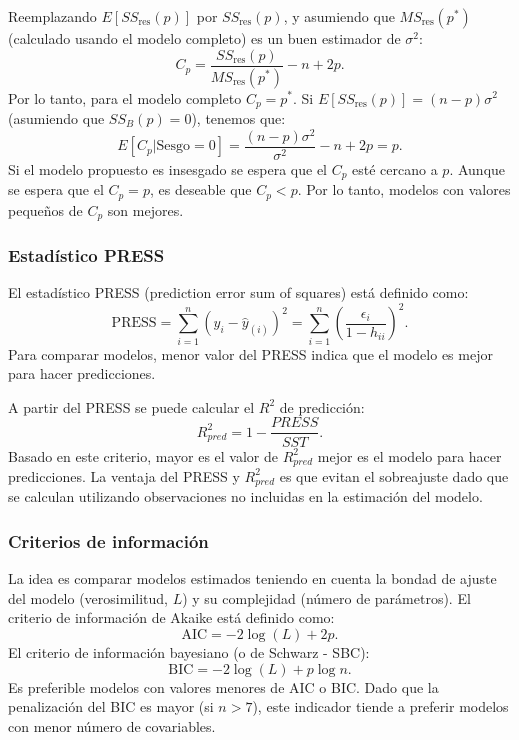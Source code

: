 \documentclass[
]{article}
\begin{document}
Reemplazando \(E[SS_{\mbox{res}}(p)]\) por \(SS_{\mbox{res}}(p)\), y asumiendo que \(MS_{\mbox{res}}(p^{*})\) (calculado usando el modelo completo) es un buen estimador de \(\sigma^{2}\):
\[
C_{p} = \frac{SS_{\mbox{res}}(p)}{MS_{\mbox{res}}(p^{*})} - n + 2p.
\]
Por lo tanto, para el modelo completo \(C_{p} = p^{*}\). Si \(E[SS_{\mbox{res}}(p)] = (n-p)\sigma^{2}\) (asumiendo que \(SS_{B}(p)=0\)), tenemos que:
\[
E[C_{p}| \mbox{Sesgo}=0] = \frac{(n-p)\sigma^{2}}{\sigma^{2}} - n +2p = p.
\]
Si el modelo propuesto es insesgado se espera que el \(C_p\) esté cercano a \(p\). Aunque se espera que el \(C_p=p\), es deseable que \(C_p < p\). Por lo tanto, modelos con valores pequeños de \(C_p\) son mejores.

\hypertarget{estaduxedstico-press}{%
\subsubsection{Estadístico PRESS}\label{estaduxedstico-press}}

El estadístico PRESS (prediction error sum of squares) está definido como:
\[
\mbox{PRESS} = \sum_{i=1}^{n} (y_{i} - \widehat{y}_{(i)})^{2} = \sum_{i=1}^{n} \left( \frac{\epsilon_{i}}{1-h_{ii}} \right)^{2}.
\]
Para comparar modelos, menor valor del PRESS indica que el modelo es mejor para hacer predicciones.

A partir del PRESS se puede calcular el \(R^{2}\) de predicción:
\[
R^{2}_{pred} = 1 - \frac{PRESS}{SST}.
\]
Basado en este criterio, mayor es el valor de \(R^{2}_{pred}\) mejor es el modelo para hacer predicciones. La ventaja del PRESS y \(R_{pred}^{2}\) es que evitan el sobreajuste dado que se calculan utilizando observaciones no incluidas en la estimación del modelo.

\hypertarget{criterios-de-informaciuxf3n}{%
\subsubsection{Criterios de información}\label{criterios-de-informaciuxf3n}}

La idea es comparar modelos estimados teniendo en cuenta la bondad de ajuste del modelo (verosimilitud, \(L\)) y su complejidad (número de parámetros). El criterio de información de Akaike está definido como:
\[
\mbox{AIC} = -2\log (L) + 2p.
\]
El criterio de información bayesiano (o de Schwarz - SBC):
\[
\mbox{BIC} = -2\log (L) + p\log n.
\]
Es preferible modelos con valores menores de AIC o BIC. Dado que la penalización del BIC es mayor (si \(n > 7\)), este indicador tiende a preferir modelos con menor número de covariables.
\end{document}
